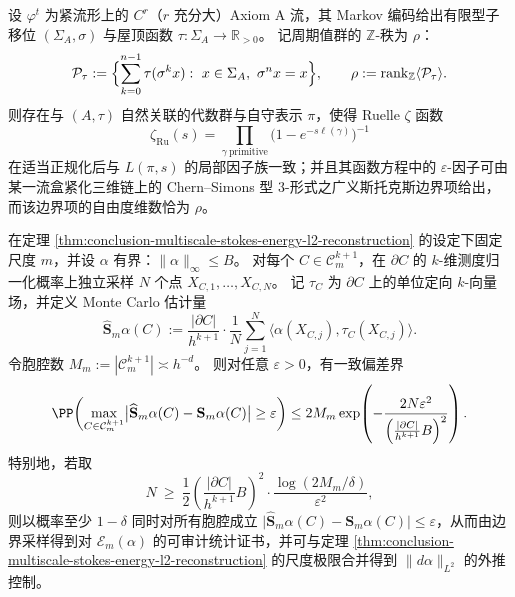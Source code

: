 \begin{conjecture}\label{conj:conclusion-stokes-boundary-langlands-bridge}
设 \(\varphi^t\) 为紧流形上的 \(C^r\)（\(r\) 充分大）Axiom A 流，其 Markov 编码给出有限型子移位 \((\Sigma_A,\sigma)\) 与屋顶函数 \(\tau:\Sigma_A\to\mathbb R_{>0}\)。
记周期值群的 \(\mathbb Z\)-秩为 \(\rho\)：
\[
\mathcal P_\tau:=\Bigl\{\sum_{k=0}^{n-1}\tau(\sigma^k x):\ x\in\Sigma_A,\ \sigma^n x=x\Bigr\},
\qquad
\rho:=\operatorname{rank}_{\mathbb Z}\langle \mathcal P_\tau\rangle.
\]
则存在与 \((A,\tau)\) 自然关联的代数群与自守表示 \(\pi\)，使得 Ruelle \(\zeta\) 函数
\[
\zeta_{\mathrm{Ru}}(s)=\prod_{\gamma\ \mathrm{primitive}}\bigl(1-e^{-s\ell(\gamma)}\bigr)^{-1}
\]
在适当正规化后与 \(L(\pi,s)\) 的局部因子族一致；并且其函数方程中的 \(\varepsilon\)-因子可由某一流盒紧化三维链上的 Chern--Simons 型 \(3\)-形式之广义斯托克斯边界项给出，而该边界项的自由度维数恰为 \(\rho\)。
\end{conjecture}

\begin{proposition}[随机边界采样的斯托克斯证书]\label{prop:conclusion-stokes-random-sampling-certificate}
在定理 \ref{thm:conclusion-multiscale-stokes-energy-l2-reconstruction} 的设定下固定尺度 \(m\)，并设 \(\alpha\) 有界：\(\|\alpha\|_{\infty}\le B\)。
对每个 \(C\in\mathcal C_m^{k+1}\)，在 \(\partial C\) 的 \(k\)-维测度归一化概率上独立采样 \(N\) 个点 \(X_{C,1},\dots,X_{C,N}\)。
记 \(\tau_C\) 为 \(\partial C\) 上的单位定向 \(k\)-向量场，并定义 Monte Carlo 估计量
\[
\widehat{\mathbf S}_m\alpha(C)
:=\frac{|\partial C|}{h^{k+1}}\cdot \frac1N\sum_{j=1}^N \langle \alpha(X_{C,j}),\tau_C(X_{C,j})\rangle.
\]
令胞腔数 \(M_m:=|\mathcal C_m^{k+1}|\asymp h^{-d}\)。
则对任意 \(\varepsilon>0\)，有一致偏差界
\[
\PP\!\left(
\max_{C\in\mathcal C_m^{k+1}}
\bigl|\widehat{\mathbf S}_m\alpha(C)-\mathbf S_m\alpha(C)\bigr|
\ge \varepsilon
\right)
\le
2M_m\exp\!\left(
-\frac{2N\varepsilon^2}{\left(\frac{|\partial C|}{h^{k+1}}B\right)^2}
\right).
\]
特别地，若取
\[
N\ \ge\
\frac12\left(\frac{|\partial C|}{h^{k+1}}B\right)^2\cdot
\frac{\log(2M_m/\delta)}{\varepsilon^2},
\]
则以概率至少 \(1-\delta\) 同时对所有胞腔成立
\(
\bigl|\widehat{\mathbf S}_m\alpha(C)-\mathbf S_m\alpha(C)\bigr|\le \varepsilon
\)，从而由边界采样得到对 \(\mathcal E_m(\alpha)\) 的可审计统计证书，并可与定理 \ref{thm:conclusion-multiscale-stokes-energy-l2-reconstruction} 的尺度极限合并得到 \(\|d\alpha\|_{L^2}\) 的外推控制。
\end{proposition}

